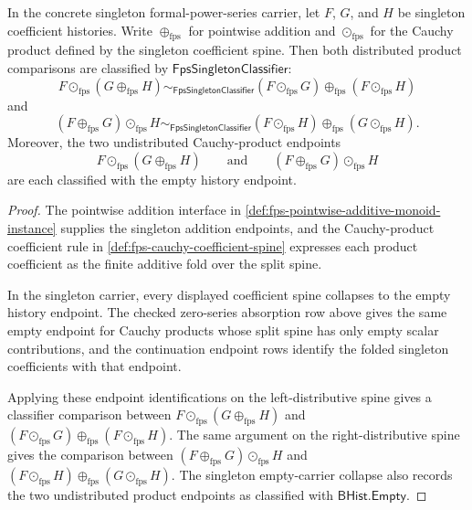 
\begin{theorem}
\label{thm:fps-cauchy-product-distributes-over-pointwise-addition}
In the concrete singleton formal-power-series carrier, let $F$, $G$, and $H$ be singleton coefficient histories. Write $\oplus_{\mathrm{fps}}$ for pointwise addition and $\odot_{\mathrm{fps}}$ for the Cauchy product defined by the singleton coefficient spine. Then both distributed product comparisons are classified by $\mathsf{FpsSingletonClassifier}$:
$$
F\odot_{\mathrm{fps}}(G\oplus_{\mathrm{fps}}H)
\sim_{\mathsf{FpsSingletonClassifier}}
(F\odot_{\mathrm{fps}}G)\oplus_{\mathrm{fps}}(F\odot_{\mathrm{fps}}H)
$$
and
$$
(F\oplus_{\mathrm{fps}}G)\odot_{\mathrm{fps}}H
\sim_{\mathsf{FpsSingletonClassifier}}
(F\odot_{\mathrm{fps}}H)\oplus_{\mathrm{fps}}(G\odot_{\mathrm{fps}}H).
$$
Moreover, the two undistributed Cauchy-product endpoints
$$
F\odot_{\mathrm{fps}}(G\oplus_{\mathrm{fps}}H)
\qquad\text{and}\qquad
(F\oplus_{\mathrm{fps}}G)\odot_{\mathrm{fps}}H
$$
are each classified with the empty history endpoint.
\end{theorem}
\begin{proof}
The pointwise addition interface in \autoref{def:fps-pointwise-additive-monoid-instance} supplies the singleton addition endpoints, and the Cauchy-product coefficient rule in \autoref{def:fps-cauchy-coefficient-spine} expresses each product coefficient as the finite additive fold over the split spine.

In the singleton carrier, every displayed coefficient spine collapses to the empty history endpoint. The checked zero-series absorption row above gives the same empty endpoint for Cauchy products whose split spine has only empty scalar contributions, and the continuation endpoint rows identify the folded singleton coefficients with that endpoint.

Applying these endpoint identifications on the left-distributive spine gives a classifier comparison between $F\odot_{\mathrm{fps}}(G\oplus_{\mathrm{fps}}H)$ and $(F\odot_{\mathrm{fps}}G)\oplus_{\mathrm{fps}}(F\odot_{\mathrm{fps}}H)$. The same argument on the right-distributive spine gives the comparison between $(F\oplus_{\mathrm{fps}}G)\odot_{\mathrm{fps}}H$ and $(F\odot_{\mathrm{fps}}H)\oplus_{\mathrm{fps}}(G\odot_{\mathrm{fps}}H)$. The singleton empty-carrier collapse also records the two undistributed product endpoints as classified with $\mathsf{BHist.Empty}$.
\end{proof}

